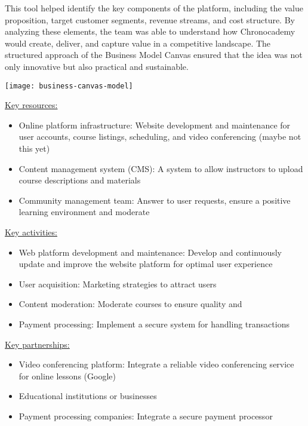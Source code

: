 This tool helped identify the key components of the platform, including the value proposition, target customer segments, revenue streams, and cost structure.
By analyzing these elements, the team was able to understand how Chronocademy would create, deliver, and capture value in a competitive landscape.
The structured approach of the Business Model Canvas ensured that the idea was not only innovative but also practical and sustainable.

\texttt{[image: business-canvas-model]}

\underline{Key resources:}
\begin{itemize}
\item Online platform infrastructure: Website development and maintenance for user accounts, course listings, scheduling, and video conferencing (maybe not this yet)
\item Content management system (CMS): A system to allow instructors to upload course descriptions and materials
\item Community management team: Answer to user requests, ensure a positive learning environment and moderate
\end{itemize}

\underline{Key activities:}
\begin{itemize}
\item Web platform development and maintenance: Develop and continuously update and improve the website platform for optimal user experience
\item User acquisition: Marketing strategies to attract users
\item Content moderation: Moderate courses to ensure quality and
\item Payment processing: Implement a secure system for handling transactions
\end{itemize}

\underline{Key partnerships:}
\begin{itemize}
\item Video conferencing platform: Integrate a reliable video conferencing service for online lessons (Google)
\item Educational institutions or businesses
\item Payment processing companies: Integrate a secure payment processor
\end{itemize}

